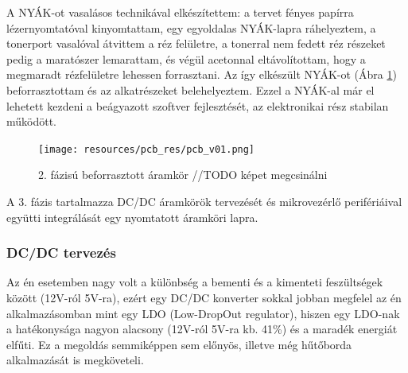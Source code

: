 \documentclass[../main.tex]{subfiles}
\begin{document}
        A NYÁK-ot vasalásos technikával elkészítettem: a tervet fényes papírra lézernyomtatóval kinyomtattam, egy egyoldalas NYÁK-lapra ráhelyeztem, a tonerport vasalóval átvittem a réz felületre, a tonerral nem fedett réz részeket pedig a maratószer lemarattam, és végül acetonnal eltávolítottam, hogy a megmaradt rézfelületre lehessen forrasztani. Az így elkészült NYÁK-ot (Ábra \ref{fig:pcb_v01}) beforrasztottam és az alkatrészeket belehelyeztem. Ezzel a NYÁK-al már el lehetett kezdeni a beágyazott szoftver fejlesztését, az elektronikai rész stabilan működött.
        
        \begin{figure}[h!]
            \centering
                \texttt{[image: resources/pcb\_res/pcb\_v01.png]}
            \caption{2. fázisú beforrasztott áramkör //TODO képet megcsinálni}
            \label{fig:pcb_v01}
        \end{figure}
        
        A 3. fázis tartalmazza DC/DC áramkörök tervezését és mikrovezérlő perifériáival együtti integrálását egy nyomtatott áramköri lapra.
        
        \subsubsection{DC/DC tervezés}
            Az én esetemben nagy volt a különbség a bementi és a kimenteti feszültségek között (12V-ról 5V-ra), ezért egy DC/DC konverter sokkal jobban megfelel az én alkalmazásomban mint egy LDO (Low-DropOut regulator), hiszen egy LDO-nak a hatékonysága nagyon alacsony (12V-ról 5V-ra kb. 41\%) és a maradék energiát elfűti. Ez a megoldás semmiképpen sem előnyös, illetve még hűtőborda alkalmazását is megköveteli.
            
            
\end{document}
